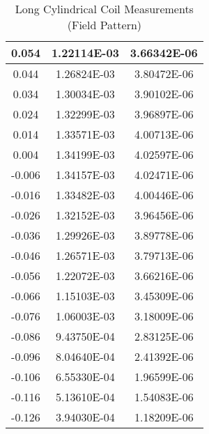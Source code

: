 \begin{appendix}
\begin{table}[H]
\begin{tabular}{c|c|c}
			0.054 & 1.22114E-03 & 3.66342E-06 \\ \hline
			0.044 & 1.26824E-03 & 3.80472E-06 \\ \hline
			0.034 & 1.30034E-03 & 3.90102E-06 \\ \hline
			0.024 & 1.32299E-03 & 3.96897E-06 \\ \hline
			0.014 & 1.33571E-03 & 4.00713E-06 \\ \hline
			0.004 & 1.34199E-03 & 4.02597E-06 \\ \hline
			-0.006 & 1.34157E-03 & 4.02471E-06 \\ \hline
			-0.016 & 1.33482E-03 & 4.00446E-06 \\ \hline
			-0.026 & 1.32152E-03 & 3.96456E-06 \\ \hline
			-0.036 & 1.29926E-03 & 3.89778E-06 \\ \hline
			-0.046 & 1.26571E-03 & 3.79713E-06 \\ \hline
			-0.056 & 1.22072E-03 & 3.66216E-06 \\ \hline
			-0.066 & 1.15103E-03 & 3.45309E-06 \\ \hline
			-0.076 & 1.06003E-03 & 3.18009E-06 \\ \hline
			-0.086 & 9.43750E-04 & 2.83125E-06 \\ \hline
			-0.096 & 8.04640E-04 & 2.41392E-06 \\ \hline
			-0.106 & 6.55330E-04 & 1.96599E-06 \\ \hline
			-0.116 & 5.13610E-04 & 1.54083E-06 \\ \hline
			-0.126 & 3.94030E-04 & 1.18209E-06 \\ \hline
		\end{tabular}
		\caption{Long Cylindrical Coil Measurements (Field Pattern)}
		\label{tab:Long_Cylindrical_Coil_Measurements_Field_Pattern}
	\end{table}
\end{appendix}
